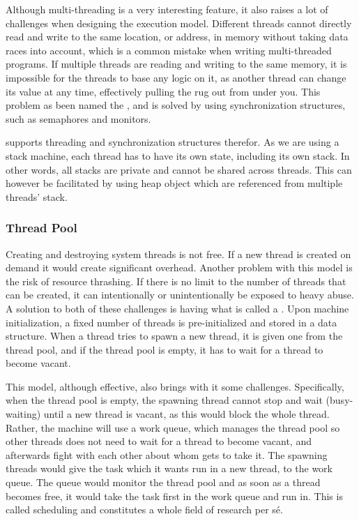 Although multi-threading is a very interesting feature, it also raises a lot of
challenges when designing the execution model. Different threads cannot directly
read and write to the same location, or address, in memory without taking data
races into account, which is a common mistake when writing multi-threaded
programs. If multiple threads are reading and writing to the same memory, it is
impossible for the threads to base any logic on it, as another thread can change
its value at any time, effectively pulling the rug out from under you. This
problem as been named the , and is solved by
using synchronization structures, such as semaphores and monitors.

\thename{} supports threading and synchronization structures therefor. As we are
using a stack machine, each thread has to have its own state, including its own
stack. In other words, all stacks are private and cannot be shared across
threads. This can however be facilitated by using heap object which are
referenced from multiple threads' stack.

\subsubsection{Thread Pool}

Creating and destroying system threads is not free. If a new thread is created
on demand it would create significant overhead. Another problem with this model
is the risk of resource thrashing. If there is no limit to the number of threads
that can be created, it can intentionally or unintentionally be exposed to heavy
abuse. A solution to both of these challenges is having what is called a
. Upon machine initialization, a fixed number of threads is
pre-initialized and stored in a data structure. When a thread tries to spawn a
new thread, it is given one from the thread pool, and if the thread pool is
empty, it has to wait for a thread to become vacant.

This model, although effective, also brings with it some
challenges. Specifically, when the thread pool is empty, the spawning thread
cannot stop and wait (busy-waiting) until a new thread is vacant, as this would
block the whole thread. Rather, the machine will use a work queue, which manages
the thread pool so other threads does not need to wait for a thread to become
vacant, and afterwards fight with each other about whom gets to take it. The
spawning threads would give the task which it wants run in a new thread, to the
work queue. The queue would monitor the thread pool and as soon as a thread
becomes free, it would take the task first in the work queue and run in. This is
called scheduling and constitutes a whole field of research per s\'e.

